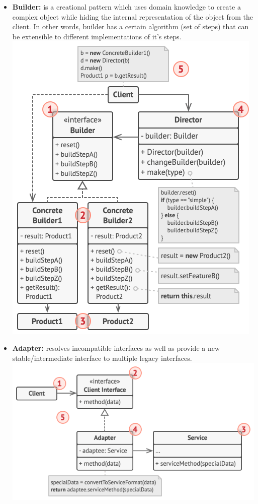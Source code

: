 \begin{itemize}
    \item \textbf{Builder:} is a creational pattern which uses domain knowledge to create a complex object while hiding the internal representation of the object from the client. In other words, builder has a certain algorithm (set of steps) that can be extensible to different implementations of it's steps.\\
    \includegraphics[width=\linewidth]{figs/builder.png}\\
    \item \textbf{Adapter:} resolves incompatible interfaces as well as provide a new stable/intermediate interface to multiple legacy interfaces.\\
    \includegraphics[width=\linewidth]{figs/adapter.png}\\

\end{itemize}
